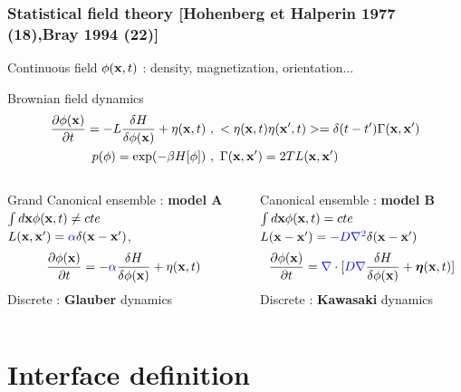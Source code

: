 \documentclass[9pt, dvipsnames,aspectratio=169]{beamer} %
\newcommand{\bx}{{\bf x}} %
\begin{document}
\begin{frame}
    \frametitle{Statistical field theory [Hohenberg et Halperin 1977 (18),Bray 1994 (22)]}
    Continuous field $\phi(\bx,t)$  : density, magnetization, orientation...  \\

    \begin{block}{Brownian field dynamics}
		\begin{align}
    		\frac{\partial \phi(\bx)}{\partial t} = - L \frac{\delta H}{\delta \phi(\bx)} + \eta(\bx,t)  &~,~  < \eta(\bx,t)\eta(\bx',t)> =\delta(t-t')\Gamma(\bx,{\bf x'}) \\
           p(\phi) = \exp(-\beta H[\phi]) &~, ~	\Gamma(\bx,\bx') =2T L(\bx,\bx')
		\end{align}    
    \end{block}
    \begin{columns}
    \begin{block}{Grand Canonical ensemble :  {\bf model A}} 
         $ \int d\bx \phi(\bx,t) \neq cte$ \\
        $L(\bx,\bx')=\textcolor{blue}{\alpha}\delta(\bx-\bx')$,
		\begin{equation}
    		\frac{\partial \phi(\bx)}{\partial t}= -\textcolor{blue}{\alpha} \frac{\delta H}{\delta \phi(\bx)} + \eta(\bx,t) 
		\end{equation}
		Discrete : {\bf Glauber} dynamics
    \end{block}    

    \begin{block}{Canonical ensemble :  {\bf model B}}
         $ \int d\bx \phi(\bx,t) = cte$ \\
        $L(\bx-\bx')= -\textcolor{blue}{D\nabla^2} \delta(\bx-{\bf x'})$
		\begin{equation}
    		\frac{\partial \phi(\bx)}{\partial t}= \textcolor{blue}{\nabla}\cdot[ \textcolor{blue}{D\nabla } \frac{\delta H}{\delta \phi(\bx)} + {\boldsymbol\eta}(\bx,t)]
		\end{equation}
		Discrete : {\bf Kawasaki} dynamics		
    \end{block}
    \end{columns}
\end{frame}


\section{Interface definition}
\end{document}
